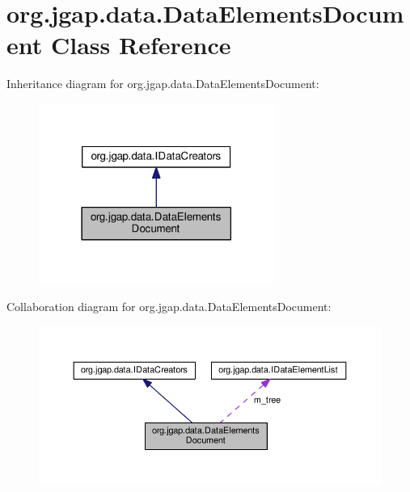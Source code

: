 \hypertarget{classorg_1_1jgap_1_1data_1_1_data_elements_document}{\section{org.\-jgap.\-data.\-Data\-Elements\-Document Class Reference}
\label{classorg_1_1jgap_1_1data_1_1_data_elements_document}
}


Inheritance diagram for org.\-jgap.\-data.\-Data\-Elements\-Document\-:
\nopagebreak
\begin{figure}[H]
\begin{center}
\leavevmode
\includegraphics[width=218pt]{classorg_1_1jgap_1_1data_1_1_data_elements_document__inherit__graph}
\end{center}
\end{figure}


Collaboration diagram for org.\-jgap.\-data.\-Data\-Elements\-Document\-:
\nopagebreak
\begin{figure}[H]
\begin{center}
\leavevmode
\includegraphics[width=350pt]{classorg_1_1jgap_1_1data_1_1_data_elements_document__coll__graph}
\end{center}
\end{figure}

